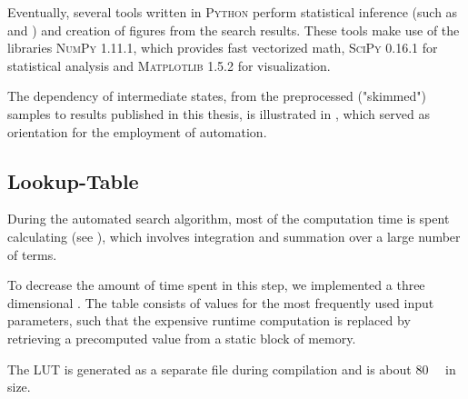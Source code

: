 Eventually, several tools written in \textsc{Python} perform statistical inference (such as \ptilde and \phat) and creation of figures from the search results. These tools make use of the libraries \textsc{NumPy} 1.11.1\cite{Walt:NumPyarraystructure}, which provides fast vectorized math, \textsc{SciPy} 0.16.1\cite{Jones:SciPyOpensource} for statistical analysis and \textsc{Matplotlib} 1.5.2\cite{Hunter:Matplotlib2Dgraphics} for visualization.

The dependency of intermediate states, from the preprocessed ("skimmed") samples to results published in this thesis, is illustrated in , which served as orientation for the employment of automation.

\subsection{Lookup-Table}
During the automated search algorithm, most of the computation time is spent calculating \TS (see ), which involves integration and summation over a large number of terms.

To decrease the amount of time spent in this step, we implemented a three dimensional . The table consists of \TS values for the most frequently used input parameters, such that the expensive runtime computation is replaced by retrieving a precomputed value from a static block of memory.

The \ac{LUT} is generated as a separate file during compilation and is about \SI{80}{\mega\byte} in size.

